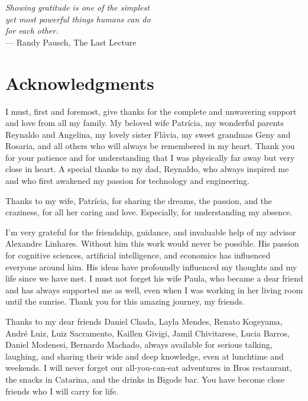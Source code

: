 
\begin{flushright}{\slshape
	Showing gratitude is one of the simplest\\
    yet most powerful things humans can do\\
    for each other.} \\ \medskip
    --- Randy Pausch, The Last Lecture
\end{flushright}

\bigskip

\begingroup
\let\clearpage\relax
\let\cleardoublepage\relax
\let\cleardoublepage\relax
\chapter*{Acknowledgments}

I must, first and foremost, give thanks for the complete and unwavering support and love from all my family. My beloved wife Patrícia, my wonderful parents Reynaldo and Angelina, my lovely sister Flávia, my sweet grandmas Geny and Rosaria, and all others who will always be remembered in my heart. Thank you for your patience and for understanding that I was physically far away but very close in heart. A special thanks to my dad, Reynaldo, who always inspired me and who first awakened my passion for technology and engineering.

Thanks to my wife, Patrícia, for sharing the dreams, the passion, and the craziness, for all her caring and love. Especially, for understanding my absence.

I'm very grateful for the friendship, guidance, and invaluable help of my advisor Alexandre Linhares. Without him this work would never be possible. His passion for cognitive sciences, artificial intelligence, and economics has influenced everyone around him. His ideas have profoundly influenced my thoughts and my life since we have met. I must not forget his wife Paula, who became a dear friend and has always supported me as well, even when I was working in her living room until the sunrise. Thank you for this amazing journey, my friends.

Thanks to my dear friends Daniel Chada, Layla Mendes, Renato Kogeyama, André Luiz, Luiz Sacramento, Kaillen Givigi, Jamil Chivitarese, Lucia Barros, Daniel Modenesi, Bernardo Machado, always available for serious talking, laughing, and sharing their wide and deep knowledge, even at lunchtime and weekends. I will never forget our all-you-can-eat adventures in Bros restaurant, the snacks in Catarina, and the drinks in Bigode bar. You have become close friends who I will carry for life.

